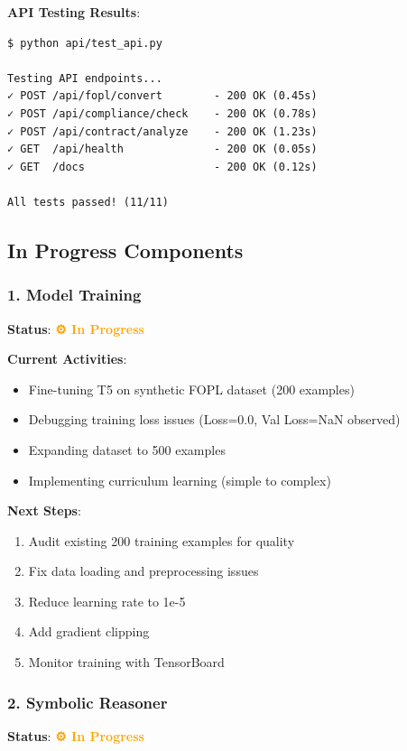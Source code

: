 \documentclass[12pt,a4paper]{article}
\begin{document}
\textbf{API Testing Results}:
\begin{verbatim}
$ python api/test_api.py

Testing API endpoints...
✓ POST /api/fopl/convert        - 200 OK (0.45s)
✓ POST /api/compliance/check    - 200 OK (0.78s)
✓ POST /api/contract/analyze    - 200 OK (1.23s)
✓ GET  /api/health              - 200 OK (0.05s)
✓ GET  /docs                    - 200 OK (0.12s)

All tests passed! (11/11)
\end{verbatim}

\subsection{In Progress Components}

\subsubsection{1. Model Training}

\textbf{Status}: \textcolor{orange}{\textbf{⚙ In Progress}}

\textbf{Current Activities}:
\begin{itemize}
    \item Fine-tuning T5 on synthetic FOPL dataset (200 examples)
    \item Debugging training loss issues (Loss=0.0, Val Loss=NaN observed)
    \item Expanding dataset to 500 examples
    \item Implementing curriculum learning (simple to complex)
\end{itemize}

\textbf{Next Steps}:
\begin{enumerate}
    \item Audit existing 200 training examples for quality
    \item Fix data loading and preprocessing issues
    \item Reduce learning rate to 1e-5
    \item Add gradient clipping
    \item Monitor training with TensorBoard
\end{enumerate}

\subsubsection{2. Symbolic Reasoner}

\textbf{Status}: \textcolor{orange}{\textbf{⚙ In Progress}}
\end{document}
